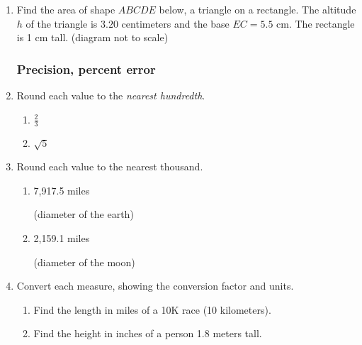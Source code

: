 \begin{enumerate}
\item Find the area of shape $ABCDE$ below, a triangle on a rectangle. The altitude $h$ of the triangle is $3.20$ centimeters and the base $EC=5.5$ cm. The rectangle is 1 cm tall. (diagram not to scale) \par \medskip
   \vspace{1.0cm}

\newpage
\subsubsection*{Precision, percent error}
\item Round each value to the \emph{nearest hundredth}.
  \begin{multicols}{2}
    \begin{enumerate}
      \item $\frac{2}{3}$
      \item $\sqrt{5}$
    \end{enumerate}
  \end{multicols} \bigskip 

\item Round each value to the nearest thousand.
  \begin{multicols}{2}
    \begin{enumerate}
      \item 7,917.5 miles \par \medskip (diameter of the earth)
      \item 2,159.1 miles \par \medskip (diameter of the moon)
    \end{enumerate}
  \end{multicols}

\item Convert each measure, showing the conversion factor and units. \par \smallskip
  \begin{enumerate}
    \item Find the length in miles of a 10K race (10 kilometers). \vspace{2cm}
    \item Find the height in inches of a person 1.8 meters tall.
  \end{enumerate} \vspace{2cm}


\end{enumerate}
